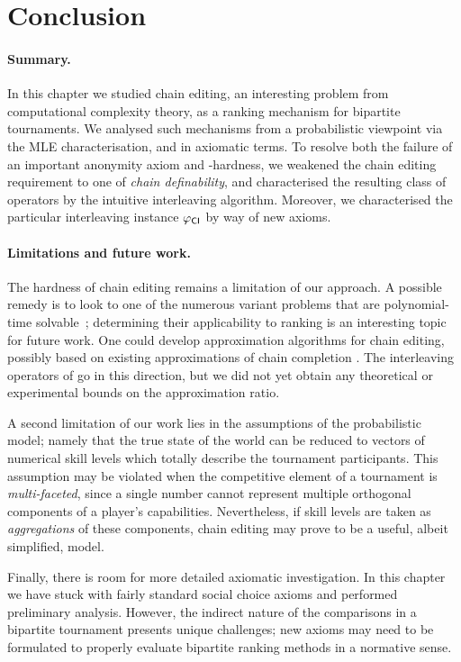\section{Conclusion}
\label{tourn_sec_conclusion}

\paragraph{Summary.}
%
In this chapter we studied chain editing, an interesting problem from
computational complexity theory, as a ranking mechanism for bipartite
tournaments. We analysed such mechanisms from a probabilistic viewpoint via the
MLE characterisation, and in axiomatic terms. To resolve both the failure of an
important anonymity axiom and -hardness, we weakened the
chain editing requirement to one of \emph{chain definability}, and
characterised the resulting class of operators by the intuitive interleaving
algorithm. Moreover, we characterised the particular interleaving instance
${\varphi_{\mathsf{CI}}}$ by way of new axioms.

\paragraph{Limitations and future work.}
%
The hardness of chain editing remains a limitation of our approach. A possible
remedy is to look to one of the numerous variant problems that are
polynomial-time solvable~\cite{jiao2017algorithms}; determining their
applicability to ranking is an interesting topic for future work. One could
develop approximation algorithms for chain editing, possibly based on existing
approximations of chain completion \cite{natanzon2000polynomial}. The
interleaving operators of  go in this direction, but we
did not yet obtain any theoretical or experimental bounds on the approximation
ratio.

A second limitation of our work lies in the assumptions of the probabilistic
model; namely that the true state of the world can be reduced to vectors of
numerical skill levels which totally describe the tournament participants. This
assumption may be violated when the competitive element of a tournament is
\emph{multi-faceted}, since a single number cannot represent multiple
orthogonal components of a player's capabilities. Nevertheless, if skill levels
are taken as \emph{aggregations} of these components, chain editing may prove
to be a useful, albeit simplified, model.

Finally, there is room for more detailed axiomatic investigation. In this
chapter
we have stuck with fairly standard social choice axioms and performed
preliminary analysis. However, the indirect nature of the comparisons in a
bipartite tournament presents unique challenges; new axioms may need to be
formulated to properly evaluate bipartite ranking methods in a normative
sense.
